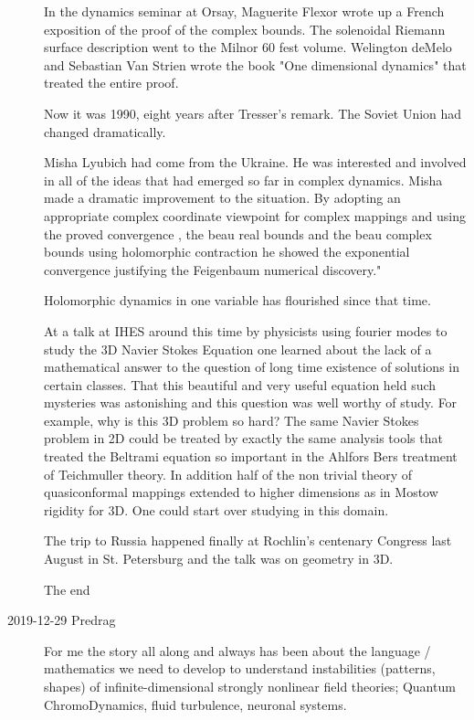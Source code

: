 \begin{description}
 In the dynamics seminar at Orsay,  Maguerite Flexor wrote up a French exposition  of the proof  of the complex bounds.  The  solenoidal Riemann surface  description  went to  the Milnor 60 fest  volume.  Welington  deMelo and Sebastian Van Strien wrote the  book   "One dimensional dynamics" that  treated  the  entire proof.

Now it was 1990, eight years after Tresser's remark. The Soviet Union had changed  dramatically.

  Misha Lyubich  had come from the Ukraine.
He was interested  and involved in all of the ideas that had emerged so far in complex dynamics.
   Misha  made a  dramatic  improvement  to the situation. By adopting an appropriate  complex coordinate viewpoint for complex mappings and using  the proved convergence , the beau  real bounds and the  beau complex bounds using holomorphic contraction he showed the  exponential convergence justifying the Feigenbaum  numerical discovery."

Holomorphic dynamics in one variable has  flourished since that time.

At a talk at IHES   around this time by physicists using fourier modes to study the 3D Navier Stokes Equation one learned about the lack of a mathematical answer to the question of long time existence of solutions in certain classes. That  this beautiful and very useful equation held such mysteries was astonishing and this question was well worthy of study.   For example, why is this 3D problem so hard? The same Navier Stokes  problem in 2D could be treated by exactly the same analysis tools that treated the Beltrami equation so important in the Ahlfors Bers treatment of Teichmuller theory.  In addition half of the non trivial theory of quasiconformal mappings extended to higher dimensions as in Mostow rigidity for  3D. One could start over studying in this domain.

  The  trip to Russia  happened finally  at Rochlin's centenary Congress last August in St. Petersburg and the talk was on geometry in 3D.

\begin{center}
The end
\end{center}

\item[2019-12-29 Predrag]
For me the story all along and always has been about the language /
mathematics we need to develop to understand instabilities (patterns,
shapes) of infinite-dimensional strongly nonlinear field theories;
Quantum ChromoDynamics, fluid turbulence, neuronal systems.


\end{description}
